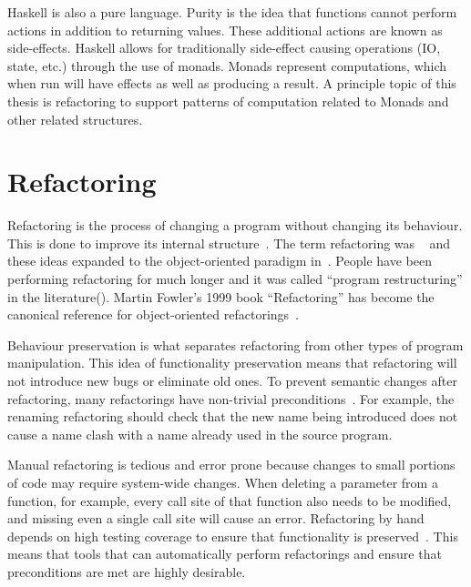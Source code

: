 Haskell is also a pure language. Purity is the idea that functions cannot perform actions in addition to returning values. These additional actions are known as side-effects. Haskell allows for traditionally side-effect causing operations (IO, state, etc.) through the use of monads. Monads represent computations, which when run will have effects as well as producing a result. A principle topic of this thesis is refactoring to support patterns of computation related to Monads and other related structures. 

\section{Refactoring} 
Refactoring is the process of changing a program without changing its behaviour. This is done to improve its internal structure~\citep{fowler}. The term refactoring was \DIFdelbegin {}\DIFdelend \DIFaddbegin {}\DIFaddend ~\citep{programRestructuring} and these ideas expanded to the object-oriented paradigm in~\citep{refactOOFrameworks}. People have been performing refactoring for much longer and it was called ``program restructuring'' in the literature(\cite{highSpeedRestructuring}\DIFdelbegin \DIFdel{, }\DIFdelend \DIFaddbegin \DIFadd{; }\DIFaddend \cite{performanceRestructuring}). Martin Fowler's 1999 book ``Refactoring'' has become the canonical reference for object-oriented refactorings~\citep{fowler}.

Behaviour preservation is what separates refactoring from other types of program manipulation. This idea of functionality preservation means that refactoring will not introduce new bugs or eliminate old ones. To prevent semantic changes after refactoring, many refactorings have non-trivial preconditions~\citep{mens2002formalising}. For example, the renaming refactoring should check that the new name being introduced does not cause a name clash with a name already used in the source program.

Manual refactoring is tedious and error prone because changes to small portions of code may require system-wide changes. When deleting a parameter from a function, for example, every call site of that function also needs to be modified, and missing even a single call site will cause an error. Refactoring by hand depends on high testing coverage to ensure that functionality is preserved~\citep{fowler}. This means that tools that can automatically perform refactorings and ensure that preconditions are met are highly desirable.

